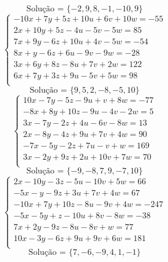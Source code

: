 \documentclass[12pt,oneside,a4paper]{article}
\begin{document}
\begin{equation*}
\text{Solução = }\{-2,9,8,-1,-10,9\}
\end{equation*}
\vspace{\baselineskip}
\begin{equation*}
\begin{cases}
-10x+7y+5z+10u+6v+10w=-55 \\
2x+10y+5z-4u-5v-5w=85 \\
7x+9y-6z+10u+4v-5w=-54 \\
8x+y-6z+6u-9v-9w=-28 \\
3x+6y+8z-8u+7v+2w=122 \\
6x+7y+3z+9u-5v+5w=98 \\
\end{cases}
\end{equation*}
\begin{equation*}
\text{Solução = }\{9,5,2,-8,-5,10\}
\end{equation*}
\vspace{\baselineskip}
\begin{equation*}
\begin{cases}
10x-7y-5z-9u+v+8w=-77 \\
-8x+8y+10z-9u-4v-2w=5 \\
3x-7y-2z+4u-6v-8w=13 \\
2x-8y-4z+9u+7v+4w=90 \\
-7x-5y-2z+7u-v+w=169 \\
3x-2y+9z+2u+10v+7w=70 \\
\end{cases}
\end{equation*}
\begin{equation*}
\text{Solução = }\{-9,-8,7,9,-7,10\}
\end{equation*}
\vspace{\baselineskip}
\begin{equation*}
\begin{cases}
2x-10y-3z-5u-10v+5w=66 \\
-5x-y-9z+3u+7v+4w=67 \\
-10x+7y+10z-8u-9v+4w=-247 \\
-5x-5y+z-10u+8v-8w=-38 \\
7x+2y-9z-8u-8v+w=77 \\
10x-3y-6z+9u+9v+6w=181 \\
\end{cases}
\end{equation*}
\begin{equation*}
\text{Solução = }\{7,-6,-9,4,1,-1\}
\end{equation*}
\end{document}
